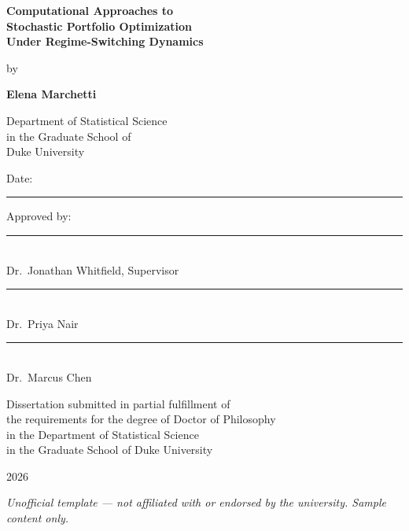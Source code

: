 \documentclass[12pt,oneside]{book}
\begin{document}
\thispagestyle{empty}
\begin{center}

\vspace*{1.2in}

{\LARGE\bfseries\color{DukeBlue} Computational Approaches to\\[6pt]
Stochastic Portfolio Optimization\\[6pt]
Under Regime-Switching Dynamics}

\vspace{0.6in}

{\large by}

\vspace{0.4in}

{\large\textbf{Elena Marchetti}}

\vspace{0.5in}

\begin{minipage}{0.8\textwidth}
\centering
\singlespacing
\small
Department of Statistical Science\\
in the Graduate School of\\
Duke University
\end{minipage}

\vspace{0.6in}

{\normalsize Date: \rule{1.2in}{0.4pt}}

\vspace{0.4in}

\begin{minipage}{0.8\textwidth}
\centering
\singlespacing
\small
Approved by:\\[10pt]
\rule{2.5in}{0.4pt}\\[4pt]
Dr.\ Jonathan Whitfield, Supervisor\\[14pt]
\rule{2.5in}{0.4pt}\\[4pt]
Dr.\ Priya Nair\\[14pt]
\rule{2.5in}{0.4pt}\\[4pt]
Dr.\ Marcus Chen
\end{minipage}

\vspace{0.4in}

{\small Dissertation submitted in partial fulfillment of\\
the requirements for the degree of Doctor of Philosophy\\
in the Department of Statistical Science\\
in the Graduate School of Duke University}

\vspace{0.8in}

{\small 2026}

\vfill

{\footnotesize\textit{Unofficial template --- not affiliated with or endorsed by the university. Sample content only.}}

\end{center}
\newpage
\end{document}
